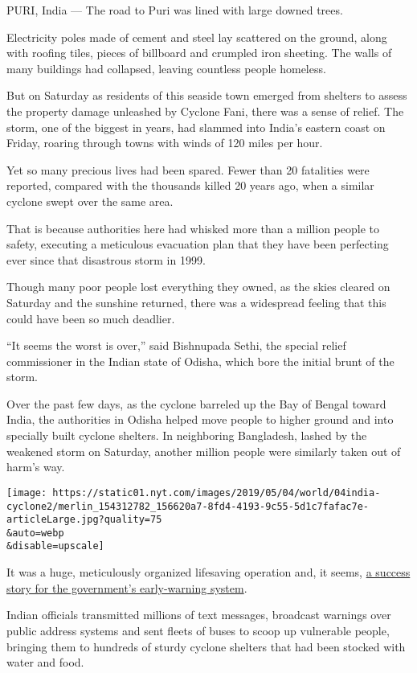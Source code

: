 PURI, India --- The road to Puri was lined with large downed trees.

Electricity poles made of cement and steel lay scattered on the ground,
along with roofing tiles, pieces of billboard and crumpled iron
sheeting. The walls of many buildings had collapsed, leaving countless
people homeless.

But on Saturday as residents of this seaside town emerged from shelters
to assess the property damage unleashed by Cyclone Fani, there was a
sense of relief. The storm, one of the biggest in years, had slammed
into India's eastern coast on Friday, roaring through towns with winds
of 120 miles per hour.

Yet so many precious lives had been spared. Fewer than 20 fatalities
were reported, compared with the thousands killed 20 years ago, when a
similar cyclone swept over the same area.

That is because authorities here had whisked more than a million people
to safety, executing a meticulous evacuation plan that they have been
perfecting ever since that disastrous storm in 1999.

Though many poor people lost everything they owned, as the skies cleared
on Saturday and the sunshine returned, there was a widespread feeling
that this could have been so much deadlier.

``It seems the worst is over,'' said Bishnupada Sethi, the special
relief commissioner in the Indian state of Odisha, which bore the
initial brunt of the storm.

Over the past few days, as the cyclone barreled up the Bay of Bengal
toward India, the authorities in Odisha helped move people to higher
ground and into specially built cyclone shelters. In neighboring
Bangladesh, lashed by the weakened storm on Saturday, another million
people were similarly taken out of harm's way.

\texttt{[image: https://static01.nyt.com/images/2019/05/04/world/04india-cyclone2/merlin\_154312782\_156620a7-8fd4-4193-9c55-5d1c7fafac7e-articleLarge.jpg?quality=75\\\&auto=webp\\\&disable=upscale]}

It was a huge, meticulously organized lifesaving operation and, it
seems,
\href{https://www.nytimes.com/2019/05/03/world/asia/cyclone-fani-india-evacuations.html}{a
success story for the government's early-warning system}.

Indian officials transmitted millions of text messages, broadcast
warnings over public address systems and sent fleets of buses to scoop
up vulnerable people, bringing them to hundreds of sturdy cyclone
shelters that had been stocked with water and food.

